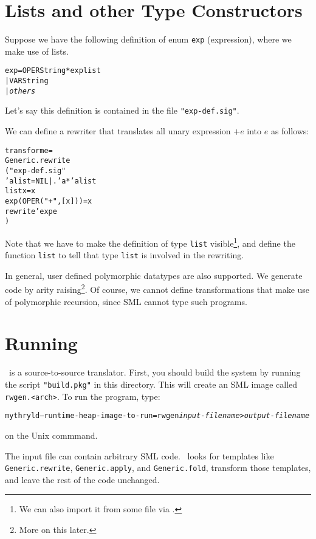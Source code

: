 \section{Lists and other Type Constructors}

Suppose we have the following definition of enum
\verb|exp| (expression), where we make use of lists.
\begin{alltt}
  \DATATYPE exp = OPER \OF String * exp list
                | VAR \OF String
                | {\em others}
\end{alltt}
Let's say this definition is contained in the file \verb|"exp-def.sig"|.

We can define a rewriter that translates all unary expression $+e$ 
into $e$ as follows:
\begin{alltt}
   \FUN transform e =
   Generic.rewrite
   ( \LET \INCLUDE "exp-def.sig"
          \DATATYPE 'a list = NIL | . \OF 'a * 'a list 
          \FUN list x = x
          \FUN exp (OPER("+",[x])) = x
     \IN  rewrite'exp e
     \END
   )
\end{alltt}
 Note that we have to make the definition of
type \verb|list| visible\footnote{We can also import it from some file
via \INCLUDE.}, and define the function \verb|list| to tell \RewriteGen{}
that type \verb|list| is involved in the rewriting. 

 In general, user defined polymorphic datatypes are also supported.
We generate code by arity raising\footnote{More on this later.}.
 Of course, we cannot define transformations that make use of 
polymorphic recursion, since SML cannot type such programs.

\section{Running \RewriteGen}

  \RewriteGen\ is a source-to-source translator.  First, you should
build the system by running the script \verb|"build.pkg"| in this
directory.  This will create an SML image called \verb|rwgen.<arch>|.
To run the program, type:
\begin{alltt}
    mythryld --runtime-heap-image-to-run=rwgen {\em input-filename} > {\em output-filename}
\end{alltt}
\noindent on the Unix commmand.

The input file can contain arbitrary SML code.  \RewriteGen\ looks
for templates like \verb|Generic.rewrite|, \verb|Generic.apply|,
and \verb|Generic.fold|, transform those templates, and
leave the rest of the code unchanged.

